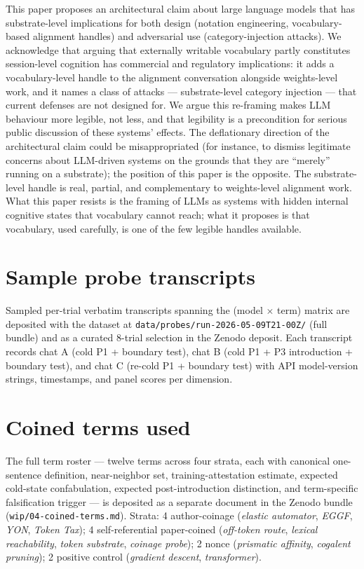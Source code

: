 \documentclass[11pt,a4paper]{article}
\begin{document}
This paper proposes an architectural claim about large language models that has substrate-level implications for both design (notation engineering, vocabulary-based alignment handles) and adversarial use (category-injection attacks). We acknowledge that arguing that externally writable vocabulary partly constitutes session-level cognition has commercial and regulatory implications: it adds a vocabulary-level handle to the alignment conversation alongside weights-level work, and it names a class of attacks --- substrate-level category injection --- that current defenses are not designed for. We argue this re-framing makes LLM behaviour more legible, not less, and that legibility is a precondition for serious public discussion of these systems' effects. The deflationary direction of the architectural claim could be misappropriated (for instance, to dismiss legitimate concerns about LLM-driven systems on the grounds that they are ``merely'' running on a substrate); the position of this paper is the opposite. The substrate-level handle is real, partial, and complementary to weights-level alignment work. What this paper resists is the framing of LLMs as systems with hidden internal cognitive states that vocabulary cannot reach; what it proposes is that vocabulary, used carefully, is one of the few legible handles available.




\appendix

\section{Sample probe transcripts}

Sampled per-trial verbatim transcripts spanning the (model $\times$ term) matrix are deposited with the dataset at \texttt{data/probes/run-2026-05-09T21-00Z/} (full bundle) and as a curated 8-trial selection in the Zenodo deposit. Each transcript records chat A (cold P1 + boundary test), chat B (cold P1 + P3 introduction + boundary test), and chat C (re-cold P1 + boundary test) with API model-version strings, timestamps, and panel scores per dimension.

\section{Coined terms used}

The full term roster --- twelve terms across four strata, each with canonical one-sentence definition, near-neighbor set, training-attestation estimate, expected cold-state confabulation, expected post-introduction distinction, and term-specific falsification trigger --- is deposited as a separate document in the Zenodo bundle (\texttt{wip/04-coined-terms.md}). Strata: 4 author-coinage (\textit{elastic automator}, \textit{EGGF}, \textit{YON}, \textit{Token Tax}); 4 self-referential paper-coined (\textit{off-token route}, \textit{lexical reachability}, \textit{token substrate}, \textit{coinage probe}); 2 nonce (\textit{prismatic affinity}, \textit{cogalent pruning}); 2 positive control (\textit{gradient descent}, \textit{transformer}).
\end{document}

